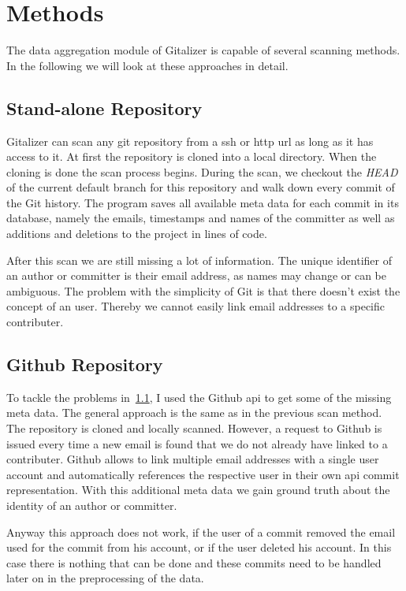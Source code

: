 \section{Methods}
The data aggregation module of Gitalizer is capable of several scanning methods.
In the following we will look at these approaches in detail.

\subsection{Stand-alone Repository}\label{stand-alone-repository-scan}
Gitalizer can scan any git repository from a \ac{ssh} or \ac{http} \acs{url} as long as it has access to it.
At first the repository is cloned into a local directory.
When the cloning is done the scan process begins.
During the scan, we checkout the \emph{HEAD} of the current default branch for this repository and walk down every commit of the Git history.
The program saves all available meta data for each commit in its database, namely the emails, timestamps and names of the committer as well as additions and deletions to the project in lines of code.

After this scan we are still missing a lot of information.
The unique identifier of an author or committer is their email address, as names may change or can be ambiguous.
The problem with the simplicity of Git is that there doesn't exist the concept of an user.
Thereby we cannot easily link email addresses to a specific contributer.


\subsection{Github Repository}\label{github-repo-scan}
To tackle the problems in~\ref{stand-alone-repository-scan}, I used the Github \ac{api} to get some of the missing meta data.
The general approach is the same as in the previous scan method. The repository is cloned and locally scanned.
However, a request to Github is issued every time a new email is found that we do not already have linked to a contributer.
Github allows to link multiple email addresses with a single user account and automatically references the respective user in their own \ac{api} commit representation.
With this additional meta data we gain ground truth about the identity of an author or committer.

Anyway this approach does not work, if the user of a commit removed the email used for the commit from his account, or if the user deleted his account.
In this case there is nothing that can be done and these commits need to be handled later on in the preprocessing of the data.



